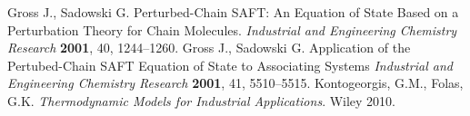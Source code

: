 \documentclass[internal,english]{sintefmemo2012}
\begin{document}
\begin{thebibliography}{11}
 Gross J., Sadowski G. Perturbed-Chain SAFT: An Equation of State Based on a Perturbation Theory for Chain Molecules. \textit{Industrial and Engineering Chemistry Research} \textbf{2001}, 40, 1244--1260.
 Gross J., Sadowski G. Application of the Pertubed-Chain SAFT Equation of State to Associating Systems \textit{Industrial and Engineering Chemistry Research} \textbf{2001}, 41, 5510--5515.
 Kontogeorgis, G.M., Folas, G.K. \textit{Thermodynamic Models for Industrial Applications}. Wiley 2010.
\end{thebibliography}
\end{document}
